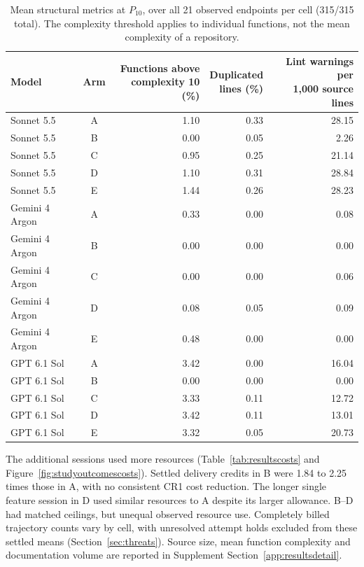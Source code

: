 \begin{table}[!htbp]
\centering\small
\caption{Mean structural metrics at $P_{10}$, over all 21 observed endpoints
per cell (315/315 total). The complexity threshold applies to individual
functions, not the mean complexity of a repository\@. \armlegend}\label{tab:resultsstructural}

\begin{tabular*}{\textwidth}{@{\extracolsep{\fill}}lcrrr@{}}
\toprule
Model & Arm & \shortstack{Functions above\\complexity 10 (\%)} & \shortstack{Duplicated\\lines (\%)} & \shortstack{Lint warnings per\\1,000 source lines} \\
\midrule
Sonnet 5.5 & A & 1.10 & 0.33 & 28.15 \\
Sonnet 5.5 & B & 0.00 & 0.05 & 2.26 \\
Sonnet 5.5 & C & 0.95 & 0.25 & 21.14 \\
Sonnet 5.5 & D & 1.10 & 0.31 & 28.84 \\
Sonnet 5.5 & E & 1.44 & 0.26 & 28.23 \\
\midrule
Gemini 4 Argon & A & 0.33 & 0.00 & 0.08 \\
Gemini 4 Argon & B & 0.00 & 0.00 & 0.00 \\
Gemini 4 Argon & C & 0.00 & 0.00 & 0.06 \\
Gemini 4 Argon & D & 0.08 & 0.05 & 0.09 \\
Gemini 4 Argon & E & 0.48 & 0.00 & 0.00 \\
\midrule
GPT 6.1 Sol & A & 3.42 & 0.00 & 16.04 \\
GPT 6.1 Sol & B & 0.00 & 0.00 & 0.00 \\
GPT 6.1 Sol & C & 3.33 & 0.11 & 12.72 \\
GPT 6.1 Sol & D & 3.42 & 0.11 & 13.01 \\
GPT 6.1 Sol & E & 3.32 & 0.05 & 20.73 \\
\bottomrule
\end{tabular*}
\end{table}

The additional sessions used more resources
(Table~\ref{tab:resultscosts} and Figure~\ref{fig:studyoutcomescosts}).
Settled delivery credits in B were 1.84 to
2.25 times those in A, with no consistent CR1 cost reduction. The longer
single feature session in D used similar resources to A despite its larger
allowance. B--D had matched ceilings, but unequal observed resource use.
Completely billed trajectory counts vary by cell, with unresolved attempt
holds excluded from these settled means (Section~\ref{sec:threats}).
Source size, mean function complexity and documentation volume are
reported in Supplement Section~\ref{app:resultsdetail}.

